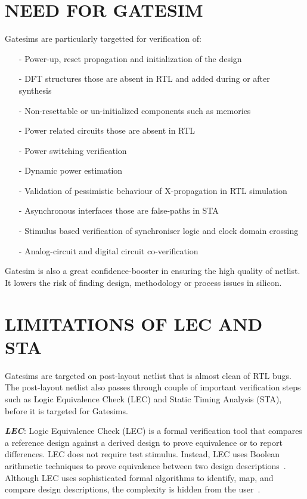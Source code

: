 \section {NEED FOR GATESIM}
Gatesims are particularly targetted for verification of:
\begin{itemize}
	\item[-]Power-up, reset propagation and initialization of the design
	\item[-]DFT structures those are absent in RTL and added during or after synthesis
	\item[-]Non-resettable or un-initialized components such as memories
	\item[-]Power related circuits those are absent in RTL
	\item[-]Power switching verification
	\item[-]Dynamic power estimation
	\item[-]Validation of pessimistic behaviour of X-propagation in RTL simulation
	\item[-]Asynchronous interfaces those are false-paths in STA
	\item[-]Stimulus based verification of synchroniser logic and clock domain crossing
	\item[-]Analog-circuit and digital circuit co-verification
\end{itemize}

Gatesim is also a great confidence-booster in ensuring the high quality of netlist. It lowers the risk of finding design, methodology or process issues in silicon.




\section{LIMITATIONS OF LEC AND STA}

Gatesims are targeted on post-layout netlist that is almost clean of RTL bugs. The post-layout netlist also passes through couple of important verification steps such as Logic Equivalence Check (LEC) and Static Timing Analysis (STA), before it is targeted for Gatesims.

\emph {\bf LEC}: Logic Equivalence Check (LEC) is a formal verification tool that compares a reference design against a derived design to prove equivalence or to report differences.  LEC does not require test stimulus. Instead, LEC uses Boolean arithmetic techniques to prove equivalence between two design descriptions~\citep{ieee:boolean}. Although LEC uses sophisticated formal algorithms to identify, map, and compare design descriptions, the complexity is hidden from the user~\citep{lec}.

